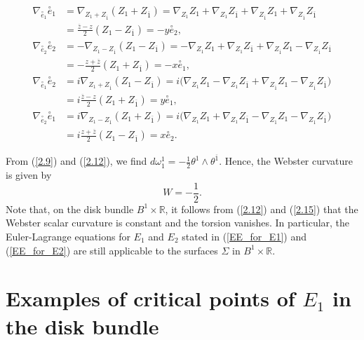 \documentclass{amsart}
\theoremstyle{Corollary}
\numberwithin{equation}{section}
\begin{document}
\begin{equation}\label{2.14}
\begin{split}
\nabla_{\overset{\circ}{e}_1}\overset{\circ}{e}_1
&=\nabla_{Z_1+Z_{\overline{1}}}(Z_1+Z_{\overline{1}})
=\nabla_{Z_1}Z_1+\nabla_{Z_1}Z_{\overline{1}}+\nabla_{Z_{\overline{1}}}Z_1+\nabla_{Z_{\overline{1}}}Z_{\overline{1}}\\
&=\frac{\overline{z}-z}{2}(Z_1-Z_{\overline{1}})=-y\overset{\circ}{e}_2,\\
\nabla_{\overset{\circ}{e}_2}\overset{\circ}{e}_2
&=-\nabla_{Z_1-Z_{\overline{1}}}(Z_1-Z_{\overline{1}})
=-\nabla_{Z_1}Z_1+\nabla_{Z_1}Z_{\overline{1}}+\nabla_{Z_{\overline{1}}}Z_1-\nabla_{Z_{\overline{1}}}Z_{\overline{1}}\\
&=-\frac{z+\overline{z}}{2}(Z_1+Z_{\overline{1}})=-x\overset{\circ}{e}_1,\\
\nabla_{\overset{\circ}{e}_1}\overset{\circ}{e}_2
&=i\nabla_{Z_1+Z_{\overline{1}}}(Z_1-Z_{\overline{1}})
=i\Big(\nabla_{Z_1}Z_1-\nabla_{Z_1}Z_{\overline{1}}+\nabla_{Z_{\overline{1}}}Z_1-\nabla_{Z_{\overline{1}}}Z_{\overline{1}}\Big)\\
&=i\frac{\overline{z}-z}{2}(Z_1+Z_{\overline{1}})=y\overset{\circ}{e}_1,\\
\nabla_{\overset{\circ}{e}_2}\overset{\circ}{e}_1
&=i\nabla_{Z_1-Z_{\overline{1}}}(Z_1+Z_{\overline{1}})
=i\Big(\nabla_{Z_1}Z_1+\nabla_{Z_1}Z_{\overline{1}}-\nabla_{Z_{\overline{1}}}Z_1-\nabla_{Z_{\overline{1}}}Z_{\overline{1}}\Big)\\
&=i\frac{z+\overline{z}}{2}(Z_1-Z_{\overline{1}})=x\overset{\circ}{e}_2.
\end{split}
\end{equation}

From (\ref{2.9}) and (\ref{2.12}), we find
$d\omega_1^1=-\frac{1}{2}\theta^1\wedge\theta^{\overline{1}}.$
Hence, the Webster curvature is given by 
\begin{equation}\label{2.15}
W=-\frac{1}{2}. 
\end{equation}
Note that, on the disk bundle $B^1\times\mathbb{R}$,
it follows from 
(\ref{2.12}) and (\ref{2.15}) that  
the Webster scalar curvature is constant and 
the torsion vanishes. 
In particular, 
the  Euler-Lagrange equations
for $E_1$ and $E_2$ stated in (\ref{EE_for_E1})  
and (\ref{EE_for_E2}) are still applicable to 
the surfaces $\Sigma$ in $B^1\times\mathbb{R}$. 

 



\section{Examples of critical points of $E_1$
in the disk bundle}\label{section3}
\end{document}
